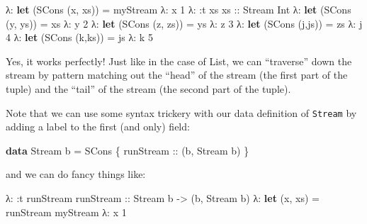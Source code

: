 \documentclass[]{article}
\newenvironment{Shaded}{}{}
\newcommand{\KeywordTok}[1]{\textcolor[rgb]{0.00,0.44,0.13}{\textbf{{#1}}}}
\newcommand{\DataTypeTok}[1]{\textcolor[rgb]{0.56,0.13,0.00}{{#1}}}
\newcommand{\DecValTok}[1]{\textcolor[rgb]{0.25,0.63,0.44}{{#1}}}
\newcommand{\OtherTok}[1]{\textcolor[rgb]{0.00,0.44,0.13}{{#1}}}
\newcommand{\FunctionTok}[1]{\textcolor[rgb]{0.02,0.16,0.49}{{#1}}}
\newcommand{\NormalTok}[1]{{#1}}
\begin{document}
\begin{Shaded}
\begin{Highlighting}[]
\NormalTok{λ}\FunctionTok{:} \KeywordTok{let} \NormalTok{(}\DataTypeTok{SCons} \NormalTok{(x, xs)) }\FunctionTok{=} \NormalTok{myStream}
\NormalTok{λ}\FunctionTok{:} \NormalTok{x}
\DecValTok{1}
\NormalTok{λ}\FunctionTok{:} \FunctionTok{:}\NormalTok{t xs}
\OtherTok{xs ::} \DataTypeTok{Stream} \DataTypeTok{Int}
\NormalTok{λ}\FunctionTok{:} \KeywordTok{let} \NormalTok{(}\DataTypeTok{SCons} \NormalTok{(y, ys)) }\FunctionTok{=} \NormalTok{xs}
\NormalTok{λ}\FunctionTok{:} \NormalTok{y}
\DecValTok{2}
\NormalTok{λ}\FunctionTok{:} \KeywordTok{let} \NormalTok{(}\DataTypeTok{SCons} \NormalTok{(z, zs)) }\FunctionTok{=} \NormalTok{ys}
\NormalTok{λ}\FunctionTok{:} \NormalTok{z}
\DecValTok{3}
\NormalTok{λ}\FunctionTok{:} \KeywordTok{let} \NormalTok{(}\DataTypeTok{SCons} \NormalTok{(j,js)) }\FunctionTok{=} \NormalTok{zs}
\NormalTok{λ}\FunctionTok{:} \NormalTok{j}
\DecValTok{4}
\NormalTok{λ}\FunctionTok{:} \KeywordTok{let} \NormalTok{(}\DataTypeTok{SCons} \NormalTok{(k,ks)) }\FunctionTok{=} \NormalTok{js}
\NormalTok{λ}\FunctionTok{:} \NormalTok{k}
\DecValTok{5}
\end{Highlighting}
\end{Shaded}

Yes, it works perfectly! Just like in the case of List, we can
``traverse'' down the stream by pattern matching out the ``head'' of the
stream (the first part of the tuple) and the ``tail'' of the stream (the
second part of the tuple).

Note that we can use some syntax trickery with our data definition of
\texttt{Stream} by adding a label to the first (and only) field:

\begin{Shaded}
\begin{Highlighting}[]
\KeywordTok{data} \DataTypeTok{Stream} \NormalTok{b }\FunctionTok{=} \DataTypeTok{SCons} \NormalTok{\{}\OtherTok{ runStream ::} \NormalTok{(b, }\DataTypeTok{Stream} \NormalTok{b) \}}
\end{Highlighting}
\end{Shaded}

and we can do fancy things like:

\begin{Shaded}
\begin{Highlighting}[]
\NormalTok{λ}\FunctionTok{:} \FunctionTok{:}\NormalTok{t runStream}
\OtherTok{runStream ::} \DataTypeTok{Stream} \NormalTok{b }\OtherTok{->} \NormalTok{(b, }\DataTypeTok{Stream} \NormalTok{b)}
\NormalTok{λ}\FunctionTok{:} \KeywordTok{let} \NormalTok{(x, xs) }\FunctionTok{=} \NormalTok{runStream myStream}
\NormalTok{λ}\FunctionTok{:} \NormalTok{x}
\DecValTok{1}
\end{Highlighting}
\end{Shaded}
\end{document}
